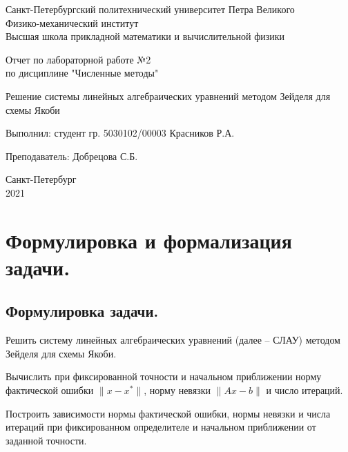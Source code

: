 \documentclass[a4paper, 12pt]{article}
\theoremstyle{definition}
\begin{document}
	\begin{titlepage}
		\begin{center}
			Санкт-Петербургский политехнический университет Петра Великого \\ Физико-механический институт \\ Высшая школа прикладной математики и вычислительной физики
		\end{center}
		\vspace{10em}
		\begin{center}
			\Large Отчет по лабораторной работе №2 \\ по дисциплине "Численные методы"
		\end{center}
		\vspace{1em}
		\begin{center}
			\Huge Решение системы линейных алгебраических уравнений методом Зейделя для схемы Якоби
		\end{center}
		\vspace{15em}
		{\Large 
			
			Выполнил: студент гр. 5030102/00003 Красников Р.А.
			\vspace{1em}
			
			Преподаватель: Добрецова С.Б.}
		\vspace{\fill}
		\begin{center}
			Санкт-Петербург \\ 2021
		\end{center}
	\end{titlepage}
	\newpage
	
	\section{Формулировка и формализация задачи.}
	
	\subsection{Формулировка задачи.}
	
	Решить систему линейных алгебраических уравнений (далее -- СЛАУ) методом Зейделя для схемы Якоби.
	
	Вычислить при фиксированной точности и начальном приближении норму фактической ошибки $\|x-x^*\|$, норму невязки $\|Ax-b\|$ и число итераций.
	
	Построить зависимости нормы фактической ошибки, нормы невязки и числа итераций при фиксированном определителе и начальном приближении от заданной точности.
	
\end{document}
